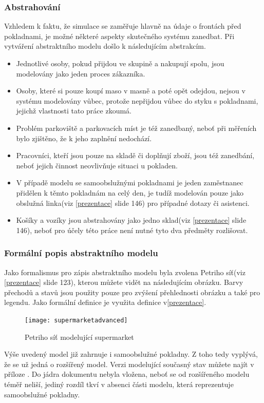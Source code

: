 \documentclass[12pt,a4paper,titlepage]{article}
\begin{document}
\subsubsection{Abstrahování}
Vzhledem k faktu, že simulace se zaměřuje hlavně na údaje o frontách před pokladnami, je možné některé aspekty skutečného systému zanedbat. Při vytváření abstraktního modelu došlo k následujícím abstrakcím. 
\begin{itemize}
\item Jednotlivé osoby, pokud přijdou ve skupině a nakupují spolu, jsou modelovány jako jeden proces zákazníka.
\item Osoby, které si pouze koupí maso v masně a poté opět odejdou, nejsou v systému modelovány vůbec, protože nepřijdou vůbec do styku s pokladnami, jejichž vlastnosti tato práce zkoumá. 
\item Problém parkoviště a parkovacích míst je též zanedbaný, neboť při měřeních bylo zjištěno, že k jeho zaplnění nedochází.
\item Pracovníci, kteří jsou pouze na skladě či doplňují zboží, jsou též zanedbání, neboť jejich činnost neovlivňuje situaci u pokladen. 
\item V případě modelu se samoobslužnými pokladnami je jeden zaměstnanec přidělen k těmto pokladnám na celý den, je tudíž modelován pouze jako obslužná linka(viz \ref{prezentace} slide 146) pro případné dotazy či asistenci.
\item Košíky a vozíky jsou abstrahovány jako jedno sklad(viz \ref{prezentace} slide 146), neboť pro účely této práce není nutné tyto dva předměty rozlišovat.   
\end{itemize}


\subsubsection{Formální popis abstraktního modelu}
Jako formalismus pro zápis abstraktního modelu byla zvolena Petriho síť(viz \ref{prezentace} slide 123), kterou můžete vidět na následujícím obrázku. Barvy přechodů a stavů jsou použity pouze pro zvýšení přehlednosti obrázku a také pro legendu. Jako formální definice je využita definice v\ref{prezentace}. \\

\begin{figure}[h]
\centering
\texttt{[image: supermarketadvanced]}
\caption{Petriho síť modelující supermarket}
\end{figure}


Výše uvedený model již zahrnuje i samoobslužné pokladny. Z toho tedy vyplývá, že se už jedná o rozšířený model. Verzi modelující současný stav můžete najít v příloze . Do jádra dokumentu nebyla vložena, neboť se od rozšířeného modelu téměř neliší, jediný rozdíl tkví v absenci části modelu, která reprezentuje samoobslužné pokladny. 
\end{document}

